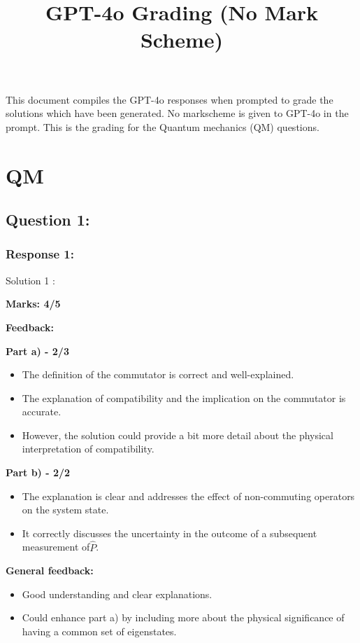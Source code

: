 \documentclass[a4paper,11pt]{article}
\title{GPT-4o Grading (No Mark Scheme)}
\begin{document}
\maketitle
This document compiles the GPT-4o responses when prompted to grade the solutions which have been generated. No markscheme is given to GPT-4o in the prompt. This is the grading for the Quantum mechanics (QM) questions.

\section{QM}

\subsection*{Question 1:}

\subsubsection*{Response 1:}

Solution 1 :

\textbf{Marks: 4/5}

\textbf{Feedback:}

\textbf{Part a) - 2/3}

\begin{itemize}
    \item The definition of the commutator is correct and well-explained.
    \item The explanation of compatibility and the implication on the commutator is accurate.
    \item However, the solution could provide a bit more detail about the physical interpretation of compatibility.
\end{itemize}

\textbf{Part b) - 2/2}

\begin{itemize}
    \item The explanation is clear and addresses the effect of non-commuting operators on the system state.
    \item It correctly discusses the uncertainty in the outcome of a subsequent measurement of$\hat{P}$.
\end{itemize}

\textbf{General feedback:}

\begin{itemize}
    \item Good understanding and clear explanations.
    \item Could enhance part a) by including more about the physical significance of having a common set of eigenstates.
\end{itemize}
\end{document}
